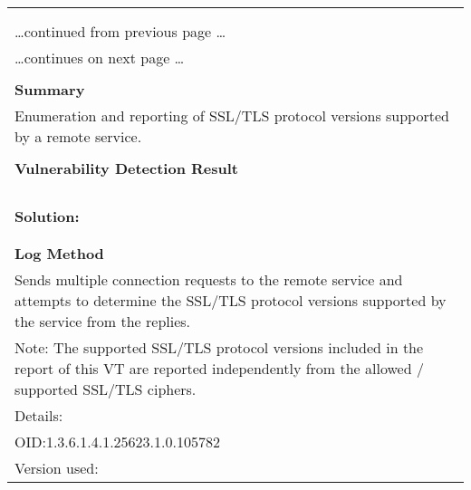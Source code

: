 \documentclass{article}
\begin{document}
\begin{longtable}{|p{}|}
\hline
\rowcolor{gvm_log}{\color{white}{Log (CVSS: 0.0) }}\\
\rowcolor{gvm_log}{\color{white}{NVT: SSL/TLS: Version Detection}}\\
\hline
\endfirsthead
\hfill\ldots continued from previous page \ldots \\
\hline
\endhead
\hline
\ldots continues on next page \ldots \\
\endfoot
\hline
\endlastfoot
\\
\textbf{Summary}\\
Enumeration and reporting of SSL/TLS protocol versions supported
  by a remote service.\\

        \hline
        \\
\textbf{Vulnerability Detection Result}\\
\rowcolor{white}{\verb=The remote SSL/TLS service supports the following SSL/TLS protocol version(s):=}\\
\rowcolor{white}{\verb=TLSv1.2=}\\
\rowcolor{white}{\verb=TLSv1.3=}\\

          \hline
          \\
\textbf{Solution:}\\
\\


        \hline
        \\
\textbf{Log Method}\\
Sends multiple connection requests to the remote service and
  attempts to determine the SSL/TLS protocol versions supported by the service from the replies.\\
  Note: The supported SSL/TLS protocol versions included in the report of this VT are reported
  independently from the allowed / supported SSL/TLS ciphers.\\
Details:
\rowcolor{white}{\verb=SSL/TLS: Version Detection=}\\
OID:1.3.6.1.4.1.25623.1.0.105782\\
Version used:
\rowcolor{white}{\verb=2021-12-06T15:42:24Z=}\\
\end{longtable}
\end{document}
